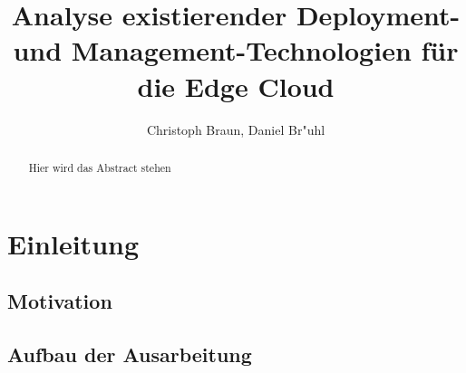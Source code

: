 \documentclass[runningheads,a4paper]{llncs}
\begin{document}


\title{Analyse existierender Deployment- und Management-Technologien für die Edge Cloud}

\author{Christoph Braun, Daniel Br"uhl}






\frontpagede %

\thispagestyle{empty}

\maketitle

\begin{abstract}
Hier wird das Abstract stehen
\end{abstract}



\section{Einleitung}



\subsection{Motivation}


\subsection{Aufbau der Ausarbeitung}

\newpage


\end{document}
